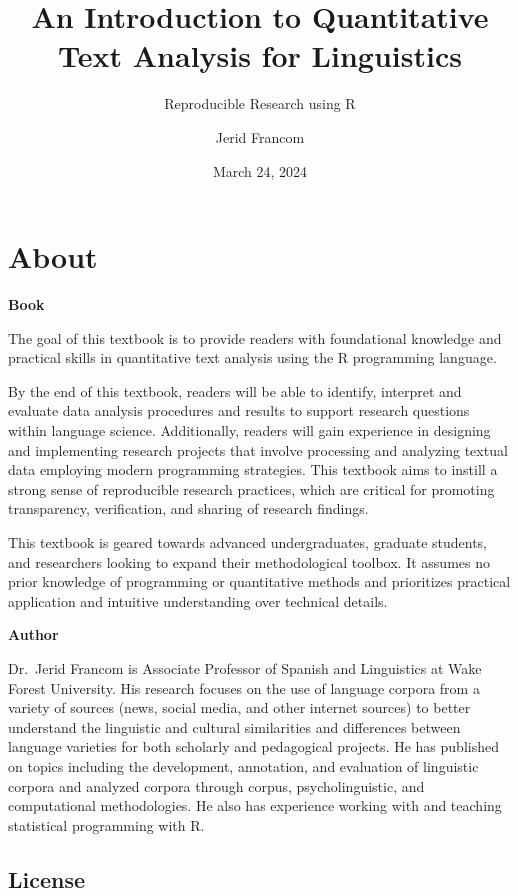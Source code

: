 \documentclass[
  letterpaper,
]{latex/krantz}
\title{An Introduction to Quantitative Text Analysis for Linguistics}
\subtitle{Reproducible Research using R}
\author{Jerid Francom}
\date{March 24, 2024}
\renewcommand*\contentsname{Table of contents}
\newcommand\contentsname{Table of contents}
\theoremstyle{definition}
\theoremstyle{remark}
\begin{document}
\maketitle

\renewcommand*\contentsname{Table of contents}
{
\setcounter{tocdepth}{2}
\tableofcontents
}

\chapter*{About}\label{about}


\textbf{Book}

The goal of this textbook is to provide readers with foundational
knowledge and practical skills in quantitative text analysis using the R
programming language.

By the end of this textbook, readers will be able to identify, interpret
and evaluate data analysis procedures and results to support research
questions within language science. Additionally, readers will gain
experience in designing and implementing research projects that involve
processing and analyzing textual data employing modern programming
strategies. This textbook aims to instill a strong sense of reproducible
research practices, which are critical for promoting transparency,
verification, and sharing of research findings.

This textbook is geared towards advanced undergraduates, graduate
students, and researchers looking to expand their methodological
toolbox. It assumes no prior knowledge of programming or quantitative
methods and prioritizes practical application and intuitive
understanding over technical details.

\textbf{Author}

Dr.~Jerid Francom is Associate Professor of Spanish and Linguistics at
Wake Forest University. His research focuses on the use of language
corpora from a variety of sources (news, social media, and other
internet sources) to better understand the linguistic and cultural
similarities and differences between language varieties for both
scholarly and pedagogical projects. He has published on topics including
the development, annotation, and evaluation of linguistic corpora and
analyzed corpora through corpus, psycholinguistic, and computational
methodologies. He also has experience working with and teaching
statistical programming with R.

\section*{License}\label{license}
\end{document}
